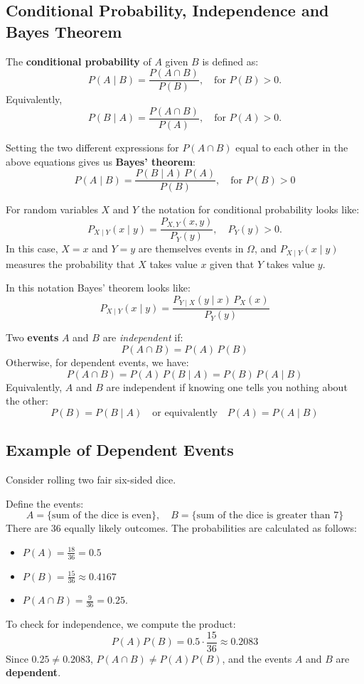 \documentclass[11pt]{article}
\begin{document}
\subsection{Conditional Probability, Independence and Bayes Theorem}


The \textbf{conditional probability} of $A$ given $B$ is defined as:
\[
P(A \mid B) = \frac{P(A \cap B)}{P(B)}, \quad \text{for } P(B) > 0.
\]
Equivalently,
\[
P(B \mid A) = \frac{P(A \cap B)}{P(A)}, \quad \text{for } P(A) > 0.
\]


Setting the two different expressions for $P(A \cap B)$ equal to each other in the above equations gives us \textbf{Bayes' theorem}:
\[
\boxed{
P(A \mid B) = \frac{P(B \mid A) \, P(A)}{P(B)}, \quad \text{for } P(B) > 0
}
\]


For random variables $X$ and $Y$ the notation for conditional probability looks like:
    \[
    P_{X \mid Y}(x \mid y) = \frac{P_{X,Y}(x,y)}{P_Y(y)}, \quad P_Y(y) > 0.
    \]
    In this case, $X=x$ and $Y=y$ are themselves events in $\Omega$, and $P_{X \mid Y}(x \mid y)$ measures the probability that $X$ takes value $x$ given that $Y$ takes value $y$.
    
    In this notation Bayes' theorem looks like:
    \begin{equation*} \boxed{
P_{X \mid Y}(x \mid y) = \frac{P_{Y \mid X}(y \mid x) \, P_X(x)}{P_Y(y)} }
\end{equation*}


Two \textbf{events} $A$ and $B$ are \emph{independent} if:
\[
P(A \cap B) = P(A) \, P(B)
\]
Otherwise, for dependent events, we have:
\[
P(A \cap B) = P(A) \, P(B \mid A) = P(B) \, P(A \mid B)
\]
Equivalently, $A$ and $B$ are independent if knowing one tells you nothing about the other:
\[
P(B) = P(B \mid A) \quad \text{or equivalently} \quad P(A) = P(A \mid B)
\]






\subsection{Example of Dependent Events}

Consider rolling two fair six-sided dice.

Define the events:
\[
A = \{\text{sum of the dice is even}\}, \quad
B = \{\text{sum of the dice is greater than 7}\}
\]
There are 36 equally likely outcomes.
The probabilities are calculated as follows:
\begin{itemize}
    \item $P(A) = \frac{18}{36} = 0.5$
    \item $P(B) = \frac{15}{36} \approx 0.4167$
    \item $P(A \cap B) = \frac{9}{36} = 0.25$.
\end{itemize}
To check for independence, we compute the product:
\[
P(A)P(B) = 0.5 \cdot \frac{15}{36} \approx 0.2083
\]
Since $0.25 \neq 0.2083$, $P(A \cap B) \neq P(A)P(B)$, and the events $A$ and $B$ are \textbf{dependent}.
\end{document}
